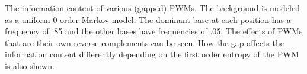 \documentclass{article} %
\begin{document}
The information content of various (gapped) PWMs. The background is modeled as a uniform 0-order Markov model. The dominant base at each position has a
frequency of .85 and the other bases have frequencies of .05. The effects of PWMs that are their own reverse complements can be seen.
How the gap affects the information content differently depending on the first order entropy of the PWM is also shown.

\begin{centering}

\end{centering}
\end{document}
